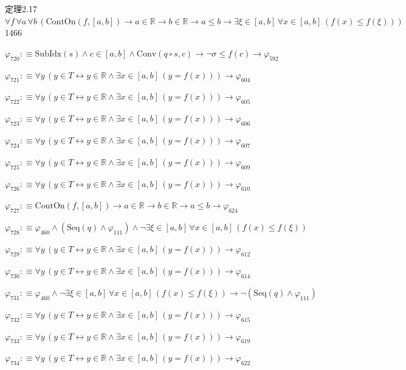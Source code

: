 \begin{fullproof}{定理2.17}{$\forall f\,\forall a\,\forall b\,(\mathrm{ContOn}(f,[a,b]) \to a \in \mathbb{R} \to b \in \mathbb{R} \to a \leq b \to \exists \xi \in [a,b]\,\forall x \in [a,b]\,(f(x) \leq f(\xi)))$}{1466}
\begin{abbrevlist}
\item $\varphi_{720} :\equiv \mathrm{SubIdx}(s) \land c \in [a,b] \land \mathrm{Conv}(q \circ s,c) \to \neg \sigma \leq f(c) \to \varphi_{592}$
\item $\varphi_{721} :\equiv \forall y\,(y \in T \leftrightarrow y \in \mathbb{R} \land \exists x \in [a,b]\,(y = f(x))) \to \varphi_{604}$
\item $\varphi_{722} :\equiv \forall y\,(y \in T \leftrightarrow y \in \mathbb{R} \land \exists x \in [a,b]\,(y = f(x))) \to \varphi_{605}$
\item $\varphi_{723} :\equiv \forall y\,(y \in T \leftrightarrow y \in \mathbb{R} \land \exists x \in [a,b]\,(y = f(x))) \to \varphi_{606}$
\item $\varphi_{724} :\equiv \forall y\,(y \in T \leftrightarrow y \in \mathbb{R} \land \exists x \in [a,b]\,(y = f(x))) \to \varphi_{607}$
\item $\varphi_{725} :\equiv \forall y\,(y \in T \leftrightarrow y \in \mathbb{R} \land \exists x \in [a,b]\,(y = f(x))) \to \varphi_{609}$
\item $\varphi_{726} :\equiv \forall y\,(y \in T \leftrightarrow y \in \mathbb{R} \land \exists x \in [a,b]\,(y = f(x))) \to \varphi_{610}$
\item $\varphi_{727} :\equiv \mathrm{ContOn}(f,[a,b]) \to a \in \mathbb{R} \to b \in \mathbb{R} \to a \leq b \to \varphi_{624}$
\item $\varphi_{728} :\equiv \varphi_{460} \land (\mathrm{Seq}(q) \land \varphi_{111}) \land \neg \exists \xi \in [a,b]\,\forall x \in [a,b]\,(f(x) \leq f(\xi))$
\item $\varphi_{729} :\equiv \forall y\,(y \in T \leftrightarrow y \in \mathbb{R} \land \exists x \in [a,b]\,(y = f(x))) \to \varphi_{612}$
\item $\varphi_{730} :\equiv \forall y\,(y \in T \leftrightarrow y \in \mathbb{R} \land \exists x \in [a,b]\,(y = f(x))) \to \varphi_{614}$
\item $\varphi_{731} :\equiv \varphi_{460} \land \neg \exists \xi \in [a,b]\,\forall x \in [a,b]\,(f(x) \leq f(\xi)) \to \neg (\mathrm{Seq}(q) \land \varphi_{111})$
\item $\varphi_{732} :\equiv \forall y\,(y \in T \leftrightarrow y \in \mathbb{R} \land \exists x \in [a,b]\,(y = f(x))) \to \varphi_{615}$
\item $\varphi_{733} :\equiv \forall y\,(y \in T \leftrightarrow y \in \mathbb{R} \land \exists x \in [a,b]\,(y = f(x))) \to \varphi_{619}$
\item $\varphi_{734} :\equiv \forall y\,(y \in T \leftrightarrow y \in \mathbb{R} \land \exists x \in [a,b]\,(y = f(x))) \to \varphi_{622}$

\end{abbrevlist}
\end{fullproof}
